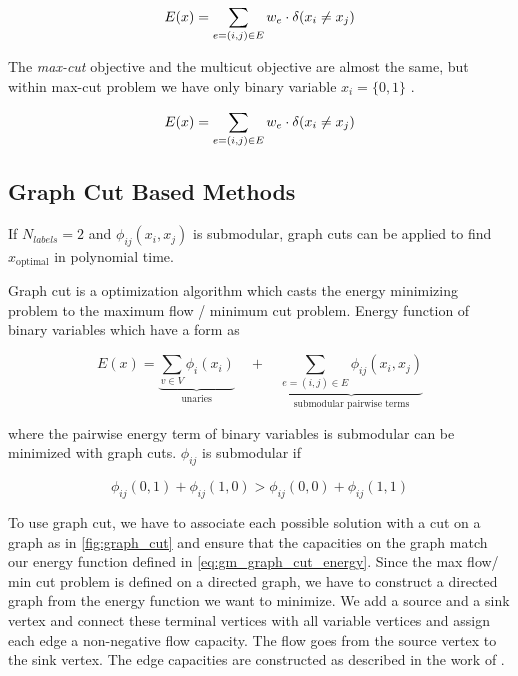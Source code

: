 \begin{align}
E(x)=
    \sum_{ e=(i,j) \in E}
        w_e \cdot \delta( x_i \neq x_j )
    \label{eq:gm_ef_multicut}
\end{align}


The \emph{max-cut} objective and  the multicut objective
are almost the same, 
but within max-cut problem we have only binary variable $x_i=\{0,1\}$ .

\begin{align}
E(x)=
    \sum_{ e=(i,j) \in E}
        w_e \cdot \delta( x_i \neq x_j )
    \label{eq:gm_ef_max_cut}
\end{align}




\subsection{Graph Cut Based Methods}

If $N_{labels}=2$ and $\phi_{ij}(x_i,x_j)$ is submodular, 
graph cuts \cite{boykov_2001_pami,kolmogorov_2004_pami} can be applied to find $x_{\text{optimal}}$
in polynomial time.

Graph cut is a optimization algorithm which casts the energy minimizing problem
to the maximum flow / minimum cut problem. Energy function of binary variables which
have a form as 

\begin{equation} \label{eq:gm_graph_cut_energy}
    E(x) = 
    \underbrace{
        \sum_{v \in V} \phi_i(x_i)
    }_{\text{unaries}}
     \quad +  \quad
    \underbrace{
        \sum_{e=(i,j) \in E } \phi_{ij}(x_i,x_j) 
    }_{\text{submodular pairwise terms}}
\end{equation}



where the pairwise energy term of binary variables is submodular can be minimized with
graph cuts. $\phi_{ij}$ is submodular if

\begin{equation} \label{eq:gm_submodular_criterion}
    \phi_{ij}(0,1) + \phi_{ij}(1,0) >  \phi_{ij}(0,0) + \phi_{ij}(1,1)
\end{equation}

To use graph cut, we have to associate each possible solution with a cut on a graph as in
\cref{fig:graph_cut} and ensure that the capacities on the graph match our energy function 
defined in \cref{eq:gm_graph_cut_energy}.
Since the max flow/ min cut problem is defined on a directed graph, we have to construct
a directed graph from the energy function we want to minimize. We add a source and a
sink vertex and connect these terminal vertices with all variable vertices and assign
each edge a non-negative flow capacity. The flow goes from the source vertex to the
sink vertex. The edge capacities are constructed as described in the work of
\citet{kolmogorov_2004_pami}.

